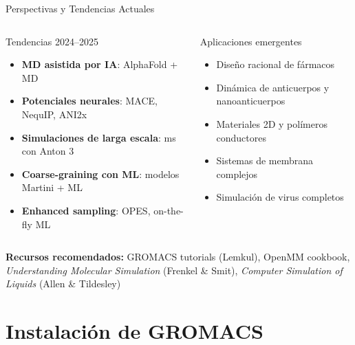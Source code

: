 \documentclass[aspectratio=169, 10pt]{beamer}
\begin{document}
\begin{frame}{Perspectivas y Tendencias Actuales}
\begin{columns}[T]
\begin{block}{Tendencias 2024--2025}
  \begin{itemize}
    \item \textbf{MD asistida por IA}: AlphaFold + MD
    \item \textbf{Potenciales neurales}: MACE, NequIP, ANI2x
    \item \textbf{Simulaciones de larga escala}: ms con Anton 3
    \item \textbf{Coarse-graining con ML}: modelos Martini + ML
    \item \textbf{Enhanced sampling}: OPES, on-the-fly ML
  \end{itemize}
\end{block}

\begin{block}{Aplicaciones emergentes}
  \begin{itemize}
    \item Diseño racional de fármacos
    \item Dinámica de anticuerpos y nanoanticuerpos
    \item Materiales 2D y polímeros conductores
    \item Sistemas de membrana complejos
    \item Simulación de virus completos
  \end{itemize}
\end{block}
\end{columns}

\vspace{0.5em}
\begin{tcolorbox}[comparisonbox]
\centering\small
\textbf{Recursos recomendados:} GROMACS tutorials (Lemkul), OpenMM cookbook, \textit{Understanding Molecular Simulation} (Frenkel \& Smit), \textit{Computer Simulation of Liquids} (Allen \& Tildesley)
\end{tcolorbox}
\end{frame}

\section{Instalación de GROMACS}
\end{document}
